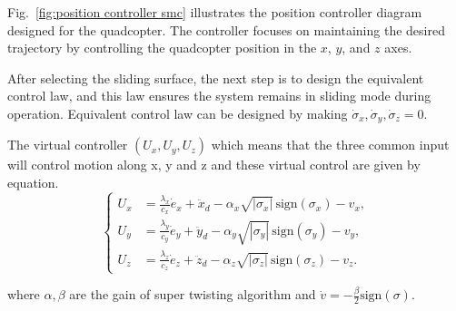 \begin{small}
\begin{enumerate}
Fig.~\ref{fig:position controller smc} illustrates the position controller diagram designed for the quadcopter. The controller focuses on maintaining the desired trajectory by controlling the quadcopter position in the $x$, $y$, and $z$ axes.

After selecting the sliding surface, the next step is to design the equivalent control law, and this law ensures the system remains in sliding mode during operation. Equivalent control law can be designed by making $\dot{\sigma}_x, \dot{\sigma}_y, \dot{\sigma}_z = 0$.

The virtual controller $(U_x, U_y, U_z)$ which means that the three common input will control
motion along x, y and z and these virtual control are given by equation.
\begin{equation}
\left\{
\begin{aligned}
U_x &= \frac{\lambda_x}{c_x}\dot{e}_x + \ddot{x}_d - \alpha_x \sqrt{|\sigma_x|}\, \text{sign}(\sigma_x) - v_x, \\[6pt]
U_y &= \frac{\lambda_y}{c_y}\dot{e}_y + \ddot{y}_d - \alpha_y \sqrt{|\sigma_y|}\, \text{sign}(\sigma_y) - v_y, \\[6pt]
U_z &= \frac{\lambda_z}{c_z}\dot{e}_z + \ddot{z}_d - \alpha_z \sqrt{|\sigma_z|}\, \text{sign}(\sigma_z) - v_z.
\end{aligned}
\right.
\label{eq:virtual control law for position}
\end{equation}

where $\alpha, \beta$ are the gain of super twisting algorithm and 
$\dot{v} = -\frac{\beta}{2}\text{sign}(\sigma)$.






\end{enumerate}
\end{small}
